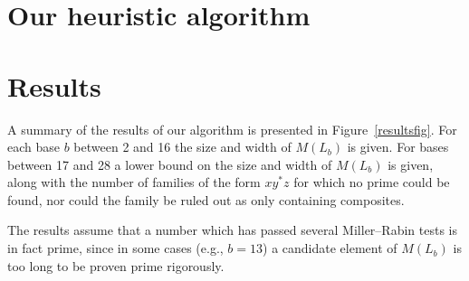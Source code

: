 \documentclass[12pt]{article}
\theoremstyle{plain}
\theoremstyle{definition}
\theoremstyle{remark}
\newcommand{\0}{\mathtt{0}}
\newcommand{\1}{\mathtt{1}}
\newcommand{\2}{\mathtt{2}}
\newcommand{\3}{\mathtt{3}}
\newcommand{\4}{\mathtt{4}}
\newcommand{\5}{\mathtt{5}}
\newcommand{\6}{\mathtt{6}}
\newcommand{\7}{\mathtt{7}}
\newcommand{\8}{\mathtt{8}}
\newcommand{\9}{\mathtt{9}}
\begin{document}
\section{Our heuristic algorithm}

\section{Results}
A summary of the results of our algorithm is presented in Figure~\ref{resultsfig}.
For each base $b$ between 2 and 16 the size and width of $M(L_b)$ is given.
For bases between 17 and 28 a lower bound on the size and width of $M(L_b)$ is given,
along with the number of families of the form $xy^*z$ for which no prime could be found,
nor could the family be ruled out as only containing composites.

The results assume that a number which has passed several Miller--Rabin
tests is in fact prime, since in some cases (e.g., $b=13$) a candidate element of $M(L_b)$
is too long to be proven prime rigorously.
\end{document}
